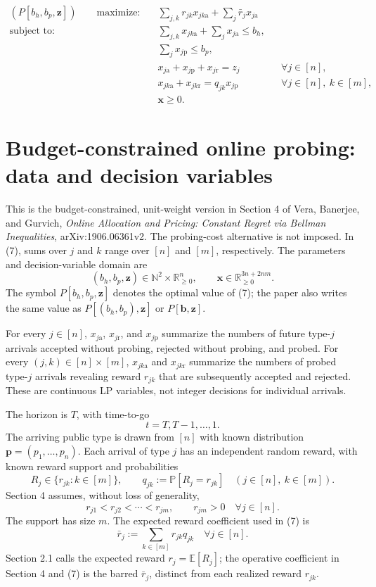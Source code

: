\documentclass{article}
\begin{document}
\begin{equation}
\begin{aligned}
(P[b_h,b_p,\mathbf z])\qquad \text{maximize:}\quad
 &\sum_{j,k}r_{jk}x_{jk\mathrm a}+\sum_j\bar r_jx_{j\mathrm a}\\
\text{subject to:}\quad
 &\sum_{j,k}x_{jk\mathrm a}+\sum_jx_{j\mathrm a}\le b_h,\\
 &\sum_jx_{j\mathrm p}\le b_p,\\
 &x_{j\mathrm a}+x_{j\mathrm p}+x_{j\mathrm r}=z_j
 &&\forall j\in[n],\\
 &x_{jk\mathrm a}+x_{jk\mathrm r}=q_{jk}x_{j\mathrm p}
 &&\forall j\in[n],\ k\in[m],\\
 &\mathbf x\ge0.
\end{aligned}\tag{7}
\end{equation}

\section*{Budget-constrained online probing: data and decision variables}
This is the budget-constrained, unit-weight version in Section 4 of Vera, Banerjee, and Gurvich, \emph{Online Allocation and Pricing: Constant Regret via Bellman Inequalities}, arXiv:1906.06361v2. The probing-cost alternative is not imposed. In (7), sums over $j$ and $k$ range over $[n]$ and $[m]$, respectively. The parameters and decision-variable domain are
\[
(b_h,b_p,\mathbf z)\in\mathbb N^2\times\mathbb R_{\ge0}^{n},
\qquad
\mathbf x\in\mathbb R_{\ge0}^{3n+2nm}.
\]
The symbol $P[b_h,b_p,\mathbf z]$ denotes the optimal value of (7); the paper also writes the same value as $P[(b_h,b_p),\mathbf z]$ or $P[\mathbf b,\mathbf z]$.

For every $j\in[n]$, $x_{j\mathrm a}$, $x_{j\mathrm r}$, and $x_{j\mathrm p}$ summarize the numbers of future type-$j$ arrivals accepted without probing, rejected without probing, and probed. For every $(j,k)\in[n]\times[m]$, $x_{jk\mathrm a}$ and $x_{jk\mathrm r}$ summarize the numbers of probed type-$j$ arrivals revealing reward $r_{jk}$ that are subsequently accepted and rejected. These are continuous LP variables, not integer decisions for individual arrivals.

The horizon is $T$, with time-to-go
\[
t=T,T-1,\ldots,1.
\]
The arriving public type is drawn from $[n]$ with known distribution $\mathbf p=(p_1,\ldots,p_n)$. Each arrival of type $j$ has an independent random reward, with known reward support and probabilities
\[
R_j\in\{r_{jk}:k\in[m]\},\qquad
q_{jk}:=\mathbb P[R_j=r_{jk}]
\quad(j\in[n],\ k\in[m]).
\]
Section 4 assumes, without loss of generality,
\[
r_{j1}<r_{j2}<\cdots<r_{jm},\qquad r_{jm}>0
\quad\forall j\in[n].
\]
The support has size $m$. The expected reward coefficient used in (7) is
\[
\bar r_j:=\sum_{k\in[m]}r_{jk}q_{jk}\quad\forall j\in[n].
\]
Section 2.1 calls the expected reward $r_j=\mathbb E[R_j]$; the operative coefficient in Section 4 and (7) is the barred $\bar r_j$, distinct from each realized reward $r_{jk}$.
\end{document}
